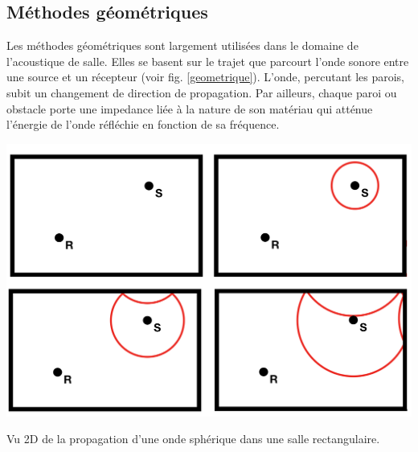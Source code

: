 %
%







	\subsection{Méthodes géométriques} \label{sect_methode_geo}
	
Les méthodes géométriques sont largement utilisées dans le domaine de l'acoustique de salle. Elles se basent sur le trajet que parcourt l'onde sonore entre une source et un récepteur (voir fig. \ref{geometrique}). L'onde, percutant les parois, subit un changement de direction de propagation. Par ailleurs, chaque paroi ou obstacle porte une \gls{impedance} liée à la nature de son matériau qui atténue l'énergie de l'onde réfléchie en fonction de sa fréquence.

\begin{figureth}
	\includegraphics[width=0.8\linewidth]{images/geometrique}
	\caption{Vu 2D de la propagation d'une onde sphérique dans une salle rectangulaire.}
	\label{geometrique}
\end{figureth}

